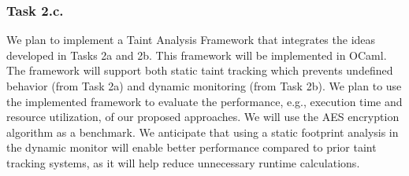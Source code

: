 \subsubsection{Task 2.c.} 
We plan to implement a Taint Analysis Framework that integrates the ideas developed in Tasks 2a and 2b. 
%
This framework will be implemented in OCaml.
%
The framework will support both static taint tracking which prevents undefined behavior (from Task 2a) and dynamic monitoring (from Task 2b).
%
We plan to use the implemented framework to evaluate the performance, e.g., execution time and resource utilization, of our proposed approaches. 
% 
We will use the AES encryption algorithm as a benchmark.
%
We anticipate that using a static footprint analysis in the dynamic monitor will enable better performance compared to prior taint tracking systems, as it will help reduce unnecessary runtime calculations.
